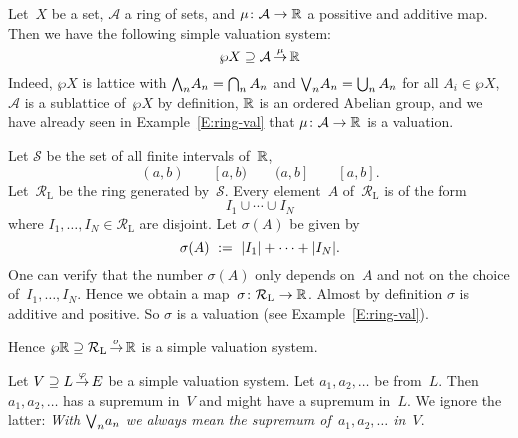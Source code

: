 \documentclass[main.tex]{subfiles}
\begin{document}
\begin{ex}
\label{E:ring-system}
Let~$X$ be a set, 
$\mathcal{A}$ a ring of sets,
and $\mu\colon \mathcal{A}\rightarrow \mathbb{R}$
a possitive and additive map.
Then we have the following simple valuation system:
\begin{equation*}
\wp X \supseteq \mathcal{A}\,\smash{\stackrel{\mu}{\rightarrow}}\,\mathbb{R}
\end{equation*}
Indeed, $\wp X$ is lattice with 
$\textstyle{\bigwedge}_n A_n = \bigcap_n A_n$
and $\textstyle{\bigvee}_n A_n = \bigcup_n A_n$ for all $A_i \in \wp X$,
$\mathcal{A}$ is a sublattice of~$\wp X$
by definition,
$\mathbb{R}$ is an ordered Abelian group,
and we have already seen in Example~\ref{E:ring-val}
that $\mu\colon \mathcal{A}\rightarrow \mathbb{R}$ is a valuation.
\end{ex}

\begin{ex}
Let $\mathcal{S}$ be the set of all finite intervals of~$\mathbb{R}$,
\begin{equation*}
(a,b)\qquad [a,b)\qquad (a,b]\qquad [a,b].
\end{equation*}
Let~$\mathcal{R}_\mathrm{L}$ be the ring generated by~$\mathcal{S}$.
Every element~$A$ of~$\mathcal{R}_\mathrm{L}$ is of the form
\begin{equation*}
I_1 \cup \dotsb \cup I_N
\end{equation*}
where $I_1,\dotsc,I_N\in \mathcal{R}_\mathrm{L}$
are disjoint.
Let $\sigma(A)$ be given by
\begin{equation*}
\sigma(A) \ :=\  |I_1| + \dotsb + |I_N|.
\end{equation*}
One can verify that the number $\sigma(A)$
only depends on~$A$ and not on the choice of~$I_1,\dotsc,I_N$.
Hence we obtain a map~$\sigma\colon \mathcal{R}_\mathrm{L} \rightarrow \mathbb{R}$.
Almost by definition $\sigma$ is additive and positive.
So $\sigma$ is a valuation 
(see Example~\ref{E:ring-val}).

Hence $\wp \mathbb{R} \supseteq \mathcal{R}_\mathrm{L}\,\smash{\stackrel{\sigma}{\rightarrow}}\,\mathbb{R}$
is a simple valuation system.
\end{ex}


\begin{nt}
Let $V \supseteq L\,\smash{\stackrel{\varphi}{\rightarrow}}\,E$ be a simple valuation system.
Let $a_1, a_2, \dotsc$ be from~$L$.
Then $a_1, a_2,\dotsc$ has a supremum
in~$V$ and might have a supremum in~$L$.
We ignore the latter:
\emph{With $\textstyle{\bigvee}_n a_n$
we always mean the supremum of~$a_1, a_2,\dotsc $ in~$V$}.
\end{nt}
\end{document}
